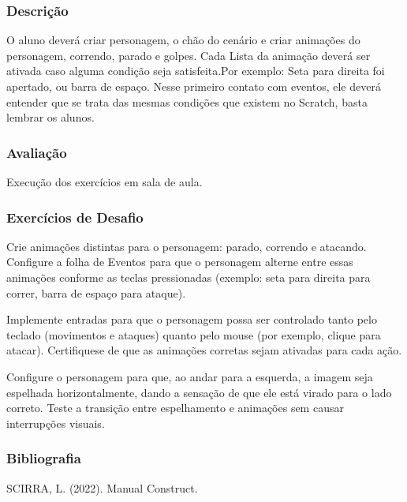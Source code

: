 \documentclass[letterpaper,10pt,brazil]{sphinxmanual}
\begin{document}
\subsubsection*{Descrição}

\sphinxAtStartPar
O aluno deverá criar personagem, o chão do cenário e criar animações do
personagem, correndo, parado e golpes.
Cada Lista da animação deverá ser ativada caso alguma condição seja satisfeita.Por
exemplo: Seta para direita foi apertado, ou barra de espaço.
Nesse primeiro contato com eventos, ele deverá entender que se trata das mesmas
condições que existem no Scratch, basta lembrar os alunos.
\subsubsection*{Avaliação}

\sphinxAtStartPar
Execução dos exercícios em sala de aula.
\subsubsection*{Exercícios de Desafio}

\sphinxAtStartPar
{}
Crie animações distintas para o personagem: parado, correndo e atacando.
Configure a folha de Eventos para que o personagem alterne entre essas animações conforme as teclas pressionadas (exemplo: seta para direita para correr, barra de espaço para ataque).

\sphinxAtStartPar
{}
Implemente entradas para que o personagem possa ser controlado tanto pelo teclado (movimentos e ataques) quanto pelo mouse (por exemplo, clique para atacar).
Certifique\sphinxhyphen{}se de que as animações corretas sejam ativadas para cada ação.

\sphinxAtStartPar
{}
Configure o personagem para que, ao andar para a esquerda, a imagem seja espelhada horizontalmente, dando a sensação de que ele está virado para o lado correto.
Teste a transição entre espelhamento e animações sem causar interrupções visuais.
\subsubsection*{Bibliografia}

\sphinxAtStartPar
SCIRRA, L. (2022). Manual Construct.
\end{document}
